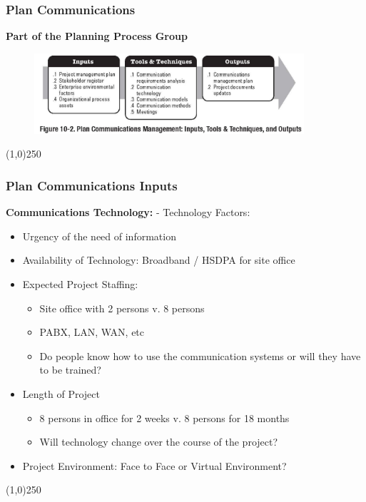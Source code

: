 \begin{frame}
\frametitle{Plan Communications}
\textbf{Part of the Planning Process Group}
\begin{figure}
	\centering
		\includegraphics[width = 10cm]{images/Fig10-2.jpg}
	\label{fig:10-2}
\end{figure}
\end{frame}\begin{center}\line(1,0){250}\end{center}



\begin{frame}
\frametitle{Plan Communications \hfill\hfill Inputs}
\textbf{Communications Technology:} - Technology Factors:\\ 
\begin{itemize}
	\item Urgency of the need of information
	\item Availability of Technology: Broadband / HSDPA for site office
	\item Expected Project Staffing: 
		\begin{itemize}
			\item Site office with 2 persons v. 8 persons
		 	\item PABX, LAN, WAN, etc
		 	\item Do people know how to use the communication systems or will they have to be trained?
		\end{itemize}
	\item Length of Project
		\begin{itemize}
			\item 8 persons in office for 2 weeks v. 8 persons for 18 months
			\item Will technology change over the course of the project?
		\end{itemize}
	\item Project Environment: Face to Face or Virtual Environment?
\end{itemize}
\end{frame}\begin{center}\line(1,0){250}\end{center}

